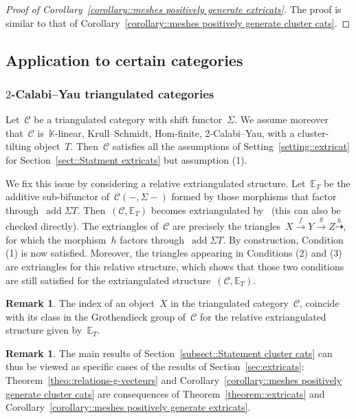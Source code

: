 \documentclass{amsart}
\theoremstyle{definition}
\newtheorem{remark}[theorem]{Remark}
\newcommand{\field}{\mathbb{K}}
\newcommand{\cat}{\mathcal{C}}
\newcommand{\susp}{\Sigma}
\newcommand{\add}{\operatorname{add}}
\begin{document}
\begin{proof}[Proof of Corollary~\ref{corollary::meshes positively generate extricats}]
The proof is similar to that of Corollary~\ref{corollary::meshes positively generate cluster cats}.
\end{proof}


\subsection{Application to certain categories}

\subsubsection{$2$-Calabi--Yau triangulated categories}
\label{sect::2CYTriangulated}

Let~$\cat$ be a triangulated category with shift functor~$\susp$.
We assume moreover that~$\cat$ is~$\field$-linear, Krull--Schmidt, Hom-finite, 2-Calabi--Yau, with a cluster-tilting object~$T$.
Then~$\cat$ satisfies all the assumptions of Setting~\ref{setting::extricat} for Section~\ref{sect::Statment extricats} but assumption (1).

We fix this issue by considering a relative extriangulated structure.
Let~$\mathbb{E}_T$ be the additive sub-bifunctor of~$\cat(-,\susp -)$ formed by those morphisms that factor through~$\add\susp T$.
Then~$(\cat,\mathbb{E}_T)$ becomes extriangulated by~\cite[Proposition 3.14]{HerschendLiuNakaoka} (this can also be checked directly).
The extriangles of~$\cat$ are precisely the triangles~$X\overset{f}{\rightarrow}Y\overset{g}{\rightarrow} Z \overset{h}{\dashrightarrow}$, for which the morphism~$h$ factors through~$\add\susp T$.
By construction, Condition (1) is now satisfied.
Moreover, the triangles appearing in Conditions (2) and (3) are extriangles for this relative structure, which shows that those two conditions are still satisfied for the extriangulated structure~$(\cat,\mathbb{E}_T)$.

\begin{remark}
The index of an object~$X$ in the triangulated category~$\cat$, coincide with its class in the Grothendieck group of~$\cat$ for the relative extriangulated structure given by~$\mathbb{E}_T$.
\end{remark}

\begin{remark}
 The main results of Section~\ref{subsect::Statement cluster cats} can thus be viewed as specific cases of the results of Section~\ref{sec:extricats}: Theorem~\ref{theo::relations-g-vecteurs} and Corollary~\ref{corollary::meshes positively generate cluster cats} are consequences of Theorem~\ref{theorem::extricats} and Corollary~\ref{corollary::meshes positively generate extricats}.
\end{remark}
\end{document}
